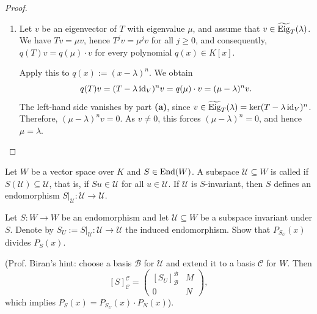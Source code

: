\begin{proof}
\begin{enumerate}[label=\textbf{(\alph*)}]
    It follows that
    \[
        \gEig_T(\lambda) = \bigcup_{j=1}^{\infty} \ker(T - \lambda \id_V)^j = \ker(T - \lambda \id_V)^k = \ker(T - \lambda \id_V)^n.
    \]
    Being a kernel of a linear map, this is a subspace of $V$.

    \item Let $v$ be an eigenvector of $T$ with eigenvalue $\mu$, and assume that $v \in \widetilde{\operatorname{Eig}}_T(\lambda)$. We have $Tv = \mu v$, hence $T^j v = \mu^j v$ for all $j \ge 0$, and consequently, $q(T)v = q(\mu) \cdot v$ for every polynomial $q(x) \in K[x]$.

    Apply this to $q(x) := (x - \lambda)^n$. We obtain
    \[
        q(T)v = (T - \lambda \operatorname{id}_V)^n v = q(\mu) \cdot v = (\mu - \lambda)^n v.
    \]
    The left-hand side vanishes by part \textbf{(a)}, since $v \in \widetilde{\operatorname{Eig}}_T(\lambda) = \ker(T - \lambda \operatorname{id}_V)^n$. Therefore, $(\mu - \lambda)^n v = 0$. As $v \neq 0$, this forces $(\mu - \lambda)^n = 0$, and hence $\mu = \lambda$.
\end{enumerate}
\end{proof}

\begin{definition}
\label{def:s_invariant_subspace}
Let $W$ be a vector space over $K$ and $S \in \operatorname{End}(W)$. A subspace $\mathcal{U} \subseteq W$ is called  if $S(\mathcal{U}) \subseteq \mathcal{U}$, that is, if $Su \in \mathcal{U}$ for all $u \in \mathcal{U}$. If $\mathcal{U}$ is $S$-invariant, then $S$ defines an endomorphism $S|_{\mathcal{U}} \colon \mathcal{U} \to \mathcal{U}$.
\end{definition}

\begin{exercise}
\label{exc:char_poly_restriction_divides}
Let $S \colon W \to W$ be an endomorphism and let $\mathcal{U} \subseteq W$ be a subspace invariant under $S$. Denote by $S_U := S|_{\mathcal{U}} \colon \mathcal{U} \to \mathcal{U}$ the induced endomorphism. Show that $P_{S_U}(x)$ divides $P_S(x)$.

(Prof. Biran's hint: choose a basis $\mathcal{B}$ for $\mathcal{U}$ and extend it to a basis $\mathcal{C}$ for $W$. Then
\[
    [S]_{\mathcal{C}}^{\mathcal{C}} = \left(\begin{array}{c|c} [S_U]_{\mathcal{B}}^{\mathcal{B}} & M \\ \hline 0 & N \end{array}\right),
\]
which implies $P_S(x) = P_{S_U}(x) \cdot P_N(x)$).
\end{exercise}

